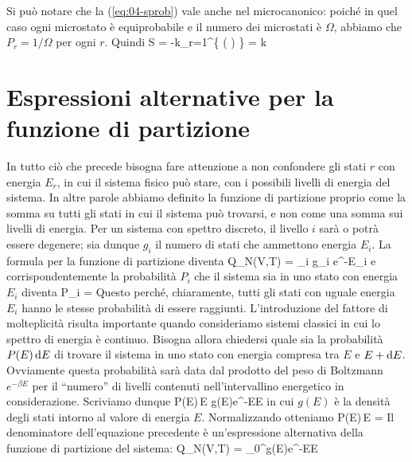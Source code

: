 Si può notare che la (\ref{eq:04-sprob}) vale anche nel microcanonico: poiché in quel caso ogni microstato è equiprobabile e il numero dei microstati è $\Omega$, abbiamo che $P_r = 1/\Omega$ per ogni $r$. Quindi
\be
S = -k\sum_{r=1}^\Omega\left\{ \ln\left(  \right) \right\} = k\ln\Omega
\ee

\section{Espressioni alternative per la funzione di partizione}
\label{sec:04-espressioni-alternative}

In tutto ciò che precede bisogna fare attenzione a non confondere gli stati $r$ con energia $E_r$, in cui il sistema fisico può stare, con i possibili livelli di energia del sistema. In altre parole abbiamo definito la funzione di partizione proprio come la somma su tutti gli stati in cui il sistema può trovarsi, e non come una somma sui livelli di energia. Per un sistema con spettro discreto, il livello $i$ sarà o potrà essere degenere; sia dunque $g_i$ il numero di stati che ammettono energia $E_i$. La formula per la funzione di partizione diventa
\be
Q_N(V,T) = \sum_i g_i e^{-\beta E_i}
\ee
e corrispondentemente la probabilità $P_i$ che il sistema sia in uno stato con energia $E_i$ diventa
\be
P_i = 
\ee
Questo perché, chiaramente, tutti gli stati con uguale energia $E_i$ hanno le stesse probabilità di essere raggiunti.
L'introduzione del fattore di molteplicità risulta importante quando consideriamo sistemi classici in cui lo spettro di energia è continuo. Bisogna allora chiedersi quale sia la probabilità $P(E)\,{\textrm d}E$ di trovare il sistema in uno stato con energia compresa tra $E$ e $E + {\textrm d}E$. Ovviamente questa probabilità sarà data dal prodotto del peso di Boltzmann $e^{-\beta E}$ per il ``numero'' di livelli contenuti nell'intervallino energetico in considerazione. Scriviamo dunque
\be
P(E)\,\de E \propto g(E)e^{-\beta E}\de E
\ee
in cui $g(E)$ è la densità degli stati intorno al valore di energia $E$. Normalizzando otteniamo
\be
P(E)\,\de E = 
\ee
Il denominatore dell'equazione precedente è un'espressione alternativa della funzione di partizione del sistema:
\be
\label{eq:04-laplace}
Q_N(V,T) = \int_0^\infty g(E)e^{-\beta E}\de E
